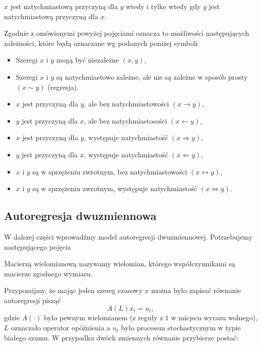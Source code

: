 \documentclass[10pt,a4paper]{book}
\begin{document}
\begin{theorem}\label{theorem-instant-casuality}
$x$ jest natychmiastową przyczyną dla $y$ wtedy i tylko wtedy gdy $y$ jest natychmiastową przyczyną dla $x$.
\end{theorem}

\begin{definition}
Zgodnie z omówionymi powyżej pojęciami oznacza to możliwości następujących zależności, które będą oznaczane wg podanych poniżej symboli
\begin{itemize}
\item Szeregi $x$ i $y$ mogą być niezależne $(x,y)$,
\item Szeregi $x$ i $y$ są natychmiastowo zależne, ale nie są zależne w sposób prosty $(x \sim y)$ (regresja).
\item $x$ jest przyczyną dla $y$, ale bez natychmiastowości $(x \rightarrow y)$,
\item $y$ jest przyczyną dla $x$, ale bez natychmiastosości $(x \leftarrow y)$,
\item $x$ jest przyczyną dla $y$, występuje natychmiastość $( x \Rightarrow y)$,
\item $y$ jest przyczyną dla $x$, występuje natychmiastość $( x \Leftarrow y)$,
\item $x$ i $y$ są w sprzężeniu zwrotnym, bez natychmiastowości $(x \leftrightarrow y)$,
\item $x$ i $y$ są w sprzężeniu zwrotnym, występuje natychmiastość $(x \Leftrightarrow y)$.
\end{itemize}
\end{definition}

\subsection{Autoregresja dwuzmiennowa}

W dalszej części wprowadźmy model autoregresji dwuzmiennowej. Potrzebujemy następującego pojęcia

\begin{definition}
Macierzą wielomianową nazywamy wielomian, którego współczynnikami są macierze zgodnego wymiaru.
\end{definition}

Przypomijmy, że mając jeden szereg czasowy $x$ można było zapisać równanie autoregresji pisząć 
$$
A(L) x_t  = u_t,
$$ 
gdzie $A(\cdot)$ było pewnym wielomianem (z reguły z $1$ w miejscu wyrazu wolnego), $L$ oznaczało operator opóźnienia a $u_t$ było procesem stochastycznym w typie białego szumu. W przypadku dwóch zmiennych równanie przybierze postać:
\end{document}

